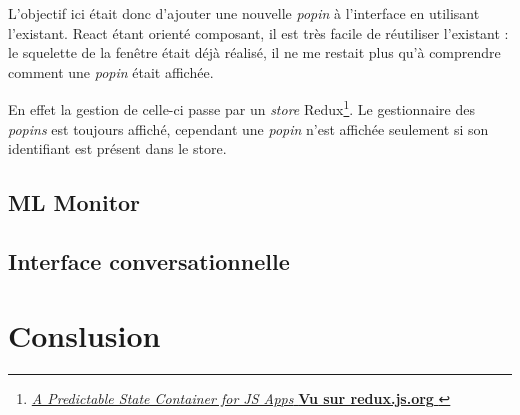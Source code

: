 \documentclass[12pt,a4paper,twoside]{scrreprt}
\begin{document}
L'objectif ici était donc d'ajouter une nouvelle \textit{popin} à l'interface en utilisant l'existant. React étant orienté composant, il est très facile de réutiliser l'existant : le squelette de la fenêtre était déjà réalisé, il ne me restait plus qu'à comprendre comment une \textit{popin} était affichée.

En effet la gestion de celle-ci passe par un \textit{store} Redux\footnote{\href{https://redux.js.org}{\og\textit{A Predictable State Container for JS Apps}\fg{} \textbf{Vu sur redux.js.org} }}. Le gestionnaire des \textit{popins} est toujours affiché, cependant une \textit{popin} n'est affichée seulement si son identifiant est présent dans le store.

\section{ML Monitor}

\section{}

\section{Interface conversationnelle}

\chapter{Conslusion}
\end{document}
